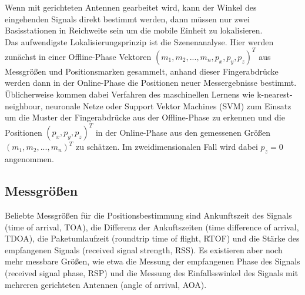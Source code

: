 Wenn mit gerichteten Antennen gearbeitet wird, kann der Winkel des eingehenden Signals direkt bestimmt werden, dann müssen nur zwei Basisstationen in Reichweite sein um die mobile Einheit zu lokalisieren. \\
Das aufwendigste Lokalisierungsprinzip ist die Szenenanalyse. Hier werden zunächst in einer Offline-Phase Vektoren $(m_1,m_2,...,m_n,p_x,p_y,p_z)^T$ aus Messgrößen und Positionsmarken gesammelt, anhand dieser Fingerabdrücke werden dann in der Online-Phase die Positionen neuer Messergebnisse bestimmt. Üblicherweise kommen dabei Verfahren des maschinellen Lernens wie k-nearest-neighbour, neuronale Netze oder Support Vektor Machines (SVM) zum Einsatz um die Muster der Fingerabdrücke aus der Offline-Phase zu erkennen und die Positionen $(p_x,p_y,p_z)^T$ in der Online-Phase aus den gemessenen Größen $(m_1,m_2,...,m_n)^T$ zu schätzen. Im zweidimensionalen Fall wird dabei $p_z = 0$ angenommen.

\subsection{Messgrößen}
Beliebte Messgrößen für die Positionsbestimmung sind Ankunftszeit des Signals (time of arrival, TOA), die Differenz der Ankuftszeiten (time difference of arrival, TDOA), die Paketumlaufzeit (roundtrip time of flight, RTOF) und die Stärke des empfangenen Signals (received signal strength, RSS). Es existieren aber noch mehr messbare Größen, wie etwa die Messung der empfangenen Phase des Signals (received signal phase, RSP) und die Messung des Einfallsswinkel des Signals mit mehreren gerichteten Antennen (angle of arrival, AOA). \\

